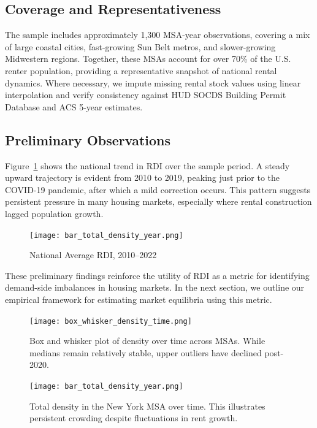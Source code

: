 \documentclass[sn-mathphys-num]{sn-jnl}%
\begin{document}
\subsection*{Coverage and Representativeness}

The sample includes approximately 1,300 MSA-year observations, covering a mix of large coastal cities, fast-growing Sun Belt metros, and slower-growing Midwestern regions. Together, these MSAs account for over 70\% of the U.S. renter population, providing a representative snapshot of national rental dynamics. Where necessary, we impute missing rental stock values using linear interpolation and verify consistency against HUD SOCDS Building Permit Database and ACS 5-year estimates.

\subsection*{Preliminary Observations}

Figure~\ref{fig:rdi_trend} shows the national trend in RDI over the sample period. A steady upward trajectory is evident from 2010 to 2019, peaking just prior to the COVID-19 pandemic, after which a mild correction occurs. This pattern suggests persistent pressure in many housing markets, especially where rental construction lagged population growth.

\begin{figure}[H]
	\centering
	\texttt{[image: bar\_total\_density\_year.png]}
	\caption*{National Average RDI, 2010--2022}
	\label{fig:rdi_trend}
\end{figure}

These preliminary findings reinforce the utility of RDI as a metric for identifying demand-side imbalances in housing markets. In the next section, we outline our empirical framework for estimating market equilibria using this metric.

\begin{figure}[H]
	\centering
	\texttt{[image: box\_whisker\_density\_time.png]}
	\caption*{Box and whisker plot of density over time across MSAs. While medians remain relatively stable, upper outliers have declined post-2020.}
	\label{fig5}
\end{figure}

\begin{figure}[H]
	\centering
	\texttt{[image: bar\_total\_density\_year.png]}
	\caption*{Total density in the New York MSA over time. This illustrates persistent crowding despite fluctuations in rent growth.}
	\label{fig2}
\end{figure}
\end{document}
